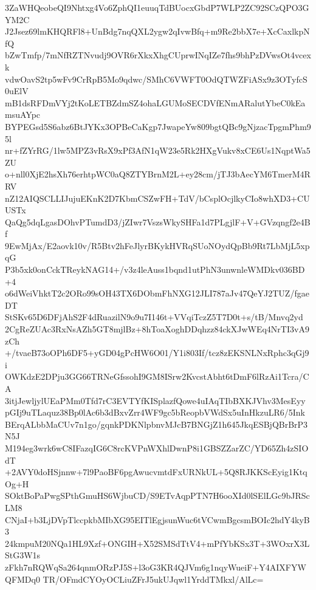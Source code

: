 3ZaWHQeobeQI9Nhtxg4Vo6ZphQI1euuqTdBUocxGbdP7WLP2ZC92SCzQPO3GYM2C
J2Jsez69lmKHQRFl8+UnBdg7nqQXL2ygw2qIvwBfq+m9Re2bbX7e+XcCaxlkpNfQ
bZwTmfp/7mNfRZTNvudj9OVR6rXkxXhgCUprwINqIZe7fhs9bhPzDVwsOt4vcexk
vdwOavS2tp5wFv9CrRpB5Mo9qdwc/SMhC6VWFT0OdQTWZFiASx9z3OTyfcS0uElV
mB1dsRFDmVYj2tKoLETBZdmSZ4ohaLGUMoSECDVfENmARalutYbeC0kEamsuAYpc
BYPEGsd5S6abz6BtJYKx3OPBeCaKgp7JwapeYw809bgtQBc9gNjzacTpgmPhm95l
nr+fZYrRG/1lw5MPZ3vRsX9xPf3AfN1qW23e5Rk2HXgVukv8xCE6Us1NqptWa5ZU
o+nll0XjE2hsXh76erhtpWC0aQ8ZTYBrnM2L+ey28cm/jTJ3bAecYM6TmerM4RRV
nZ12AIQSCLLIJujuEKnK2D7KbmCSZwFH+TdV/bCsplOcjlkyCIo8whXD3+CUUSTx
QaQg5dqLgasDOhvPTumdD3/jZIwr7VszsWkySHFa1d7PLgjlF+V+GVzqngf2e4Bf
9EwMjAx/E2aovk10v/R5Btv2hFeJlyrBKykHVRqSUoNOydQpBb9Rt7LbMjL5xpqG
P3b5xk0onCckTReykNAG14+/v3z4leAuss1bqnd1utPhN3unwnleWMDkv036BD+4
o6dWeiVhktT2c2ORo99sOH43TX6DObmFhNXG12JLI787aJv47QeYJ2TUZ/fgaeDT
StSKv65D6DFjAhS2F4dRuazilN9o9u7I146t+VVqiTczZ5T7D0t+s/tB/Mnvq2yd
2CgReZUAc3RxNsAZh5GT8mjlBz+8hToaXoghDDqhzz84ckXJwWEq4NrTI3vA9zCh
+/tvaeB73oOPh6DF5+yGD04gPcHW6O01/Y1i803If/tcz8zEKSNLNxRphc3qGj9i
OWKdzE2DPju3GG66TRNeGfssohI9GM8ISrw2KvcstAbht6tDmF6lRzAi1Tcra/CA
3itjJewljylUEaPMm0Tfd7rC3EVTYfKISplazfQowe4uIAqTIbBXKJVhv3MesEyy
pGIj9uTLaquz38Bp0lAc6b3dBxvZrr4WF9gc5bReopbVWdSx5uInHkzuLR6/5Ink
BErqALbbMaCUv7n1go/gqnkPDKNlpbnvMJcB7BNGjZ1h645JkqESBjQBrBrP3N5J
M194eg3wrk6wC8IFazqIG6C8rcKVPnWXhlDwnP8i1GBSZZarZC/YD65Zh4zSIOdT
+2AVY0doHSjnnw+7l9PaoBF6pgAwucvmtdFxURNkUL+5Q8RJKKScEyig1KtqOg+H
SOktBoPaPwgSPthGmuHS6WjbuCD/S9ETvAqpPTN7H6ooXId0lSElLGc9bJRScLM8
CNjaI+b3LjDVpTlccpkbMIbXG95EITlEgjsunWuc6tVCwmBgcsmBOIc2hdY4kyB3
24kmpuM20NQa1HL9Xzf+ONGIH+X52SMSdTtV4+mPfYbKSx3T+3WOxrX3LStG3W1s
zFkh7nRQWqSa264qnmORzPJ5S+l3oG3KR4QJVm6g1nqyWueiF+Y4AIXFYWQFMDq0
TR/OFmdCYOyOCLiuZFrJ5ukUJqwl1YrddTMkxl/AlLc=
